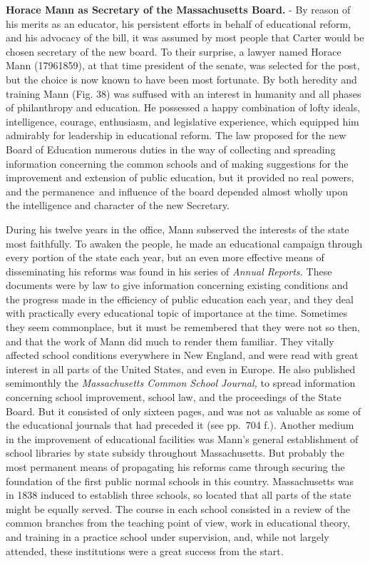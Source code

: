 \documentclass[
]{book}
\begin{document}
\textbf{Horace Mann as Secretary of the Massachusetts Board.} - By reason of his merits as an educator, his persistent efforts in behalf of educational reform, and his advocacy of the bill, it was assumed by most people that Carter would be chosen secretary of the new board. To their surprise, a lawyer named Horace Mann (17961859), at that time president of the senate, was selected for the post, but the choice is now known to have been most fortunate. By both heredity and training Mann (Fig. 38) was suffused with an interest in humanity and all phases of philanthropy and education. He possessed a happy combination of lofty ideals, intelligence, courage, enthusiasm, and legislative experience, which equipped him admirably for leadership in educational reform. The law proposed for the new Board of Education numerous duties in the way of collecting and spreading information concerning the common schools and of making suggestions for the improvement and extension of public education, but it provided no real powers, and the permanence~and influence of the board depended almost wholly upon the intelligence and character of the new Secretary.

During his twelve years in the office, Mann subserved the interests of the state most faithfully. To awaken the people, he made an educational campaign through every portion of the state each year, but an even more effective means of disseminating his reforms was found in his series of \emph{Annual Reports.} These documents were by law to give information concerning existing conditions and the progress made in the efficiency of public education each year, and they deal with practically every educational topic of importance at the time. Sometimes they seem commonplace, but it must be remembered that they were not so then, and that the work of Mann did much to render them familiar. They vitally affected school conditions everywhere in New England, and were read with great interest in all parts of the United States, and even in Europe. He also published semimonthly the \emph{Massachusetts Common School Journal,} to spread information concerning school improvement, school law, and the proceedings of the State Board. But it consisted of only sixteen pages, and was not as valuable as some of the educational journals that had preceded it (see pp.~704 f.). Another medium in the improvement of educational facilities was Mann's general establishment of school libraries by state subsidy throughout Massachusetts. But probably the most permanent means of propagating his reforms came through securing the foundation of the first public normal schools in this country. Massachusetts was in 1838 induced to establish three schools, so located that all parts of the state might be equally served. The course in each school consisted in a review of the common branches from the teaching point of view, work in educational theory, and training in a practice school under supervision, and, while not largely attended, these institutions were a great success from the start.
\end{document}
